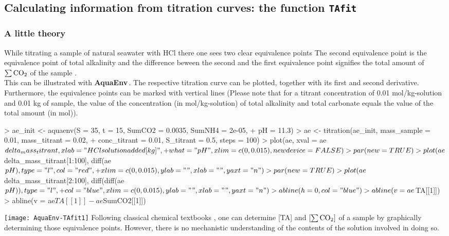 \documentclass[article,nojss]{jss}
\newcommand{\aq}{\textbf{\textsf{AquaEnv}}}
\begin{document}
\subsection{Calculating information from titration curves: the function \texttt{TAfit}}

\subsubsection{A little theory}
While titrating a sample of natural seawater with HCl there one sees two clear equivalence points \citep{Dickson1981}
The second equivalence point is the equivalence point of total alkalinity and the difference beween the second and the first
equivalence point signifies the total amount of $\sum \rm CO_2$ of the sample \cite{Hansson1973}.\\

\noindent
This can be illustrated with \aq$\,$. The respective titration curve can be plotted, together with its first and second derivative.
Furthermore, the equivalence points can be marked with vertical lines (Please note that for a titrant concentration of 0.01 mol/kg-solution
and 0.01 kg of sample, the value of the concentration (in mol/kg-solution) of total alkalinity and total carbonate equals the value of the total 
amount (in mol)).

\begin{Schunk}
\begin{Sinput}
> ae_init <- aquaenv(S = 35, t = 15, SumCO2 = 0.0035, SumNH4 = 2e-05, 
+     pH = 11.3)
> ae <- titration(ae_init, mass_sample = 0.01, mass_titrant = 0.02, 
+     conc_titrant = 0.01, S_titrant = 0.5, steps = 100)
> plot(ae, xval = ae$delta_mass_titrant, xlab = "HCl solution added [kg]", 
+     what = "pH", xlim = c(0, 0.015), newdevice = FALSE)
> par(new = TRUE)
> plot(ae$delta_mass_titrant[1:100], diff(ae$pH), type = "l", col = "red", 
+     xlim = c(0, 0.015), ylab = "", xlab = "", yaxt = "n")
> par(new = TRUE)
> plot(ae$delta_mass_titrant[2:100], diff(diff(ae$pH)), type = "l", 
+     col = "blue", xlim = c(0, 0.015), ylab = "", xlab = "", yaxt = "n")
> abline(h = 0, col = "blue")
> abline(v = ae$TA[[1]])
> abline(v = ae$TA[[1]] - ae$SumCO2[[1]])
\end{Sinput}
\end{Schunk}
\texttt{[image: AquaEnv-TAfit1]}
Following classical chemical textbooks \citep[e.g.][]{Skoog1982}, one can determine [TA] and $\rm [\sum CO_2]$ of a sample
by graphically determining those equivalence points. However, there is no mechanistic understanding of the contents of the solution involved in doing so.\\
\end{document}
